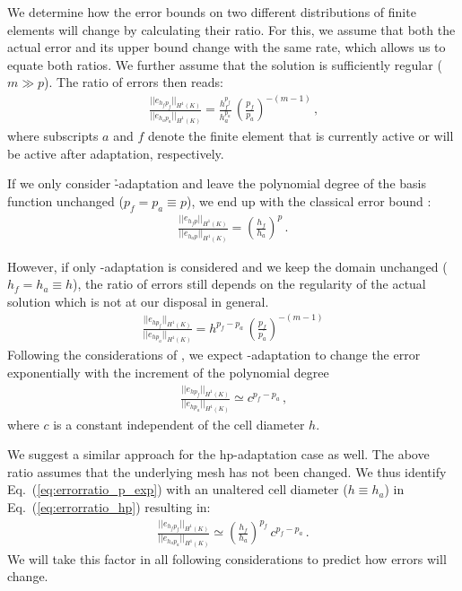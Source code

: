 We determine how the error bounds on two different distributions of finite elements will change by calculating their ratio. For this, we assume that both the actual error and its upper bound change with the same rate, which allows us to equate both ratios. We further assume that the solution is sufficiently regular ($m \gg p$). The ratio of errors then reads:
\begin{align}
\label{eq:errorratio_hp} \frac{||e_{h_f p_f}||_{H^{1}(K)}}{||e_{h_a p_a}||_{H^{1}(K)}} = \frac{h_f^{p_f}}{h_a^{p_a}} \, \left(\frac{p_f}{p_a}\right)^{-(m-1)} \,\text{,}
\end{align}
where subscripts $a$ and $f$ denote the finite element that is currently active or will be active after adaptation, respectively.

If we only consider \h-adaptation and leave the polynomial degree of the basis function unchanged ($p_f = p_a \equiv p$), we end up with the classical error bound :
\begin{align}
\label{eq:errorratio_h} \frac{||e_{h_f p}||_{H^{1}(K)}}{||e_{h_a p}||_{H^{1}(K)}} = \left( \frac{h_f}{h_a} \right)^p \,\text{.}
\end{align}

However, if only \p-adaptation is considered and we keep the domain unchanged ($h_f = h_a \equiv h$), the ratio of errors still depends on the regularity of the actual solution which is not at our disposal in general.
\begin{align}
\label{eq:errorratio_p} \frac{||e_{h p_f}||_{H^{1}(K)}}{||e_{h p_a}||_{H^{1}(K)}} = h^{p_f - p_a} \, \left(\frac{p_f}{p_a}\right)^{-(m-1)}
\end{align}
Following the considerations of \cite{melenk2001}, we expect \p-adaptation to change the error exponentially with the increment of the polynomial degree
\begin{align}
\label{eq:errorratio_p_exp} \frac{||e_{h p_f}||_{H^{1}(K)}}{||e_{h p_a}||_{H^{1}(K)}} \simeq c^{p_f - p_a} \,\text{,}
\end{align}
where $c$ is a constant independent of the cell diameter $h$.

We suggest a similar approach for the hp-adaptation case as well. The above ratio assumes that the underlying mesh has not been changed. We thus identify Eq.~(\ref{eq:errorratio_p_exp}) with an unaltered cell diameter ($h \equiv h_a$) in Eq.~(\ref{eq:errorratio_hp}) resulting in:
\begin{align}
\label{eq:errorratio_hp_exp} \frac{||e_{h_f p_f}||_{H^{1}(K)}}{||e_{h_a p_a}||_{H^{1}(K)}} \simeq \left( \frac{h_f}{h_a} \right)^{p_f} \, c^{p_f - p_a} \,\text{.}
\end{align}
We will take this factor in all following considerations to predict how errors will change.


